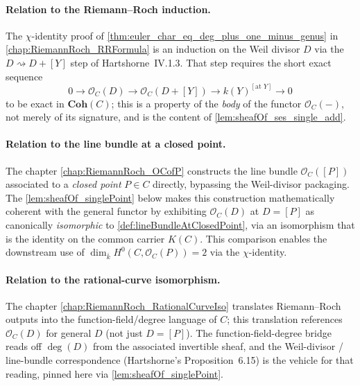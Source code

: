 \paragraph{Relation to the Riemann--Roch induction.}
The \(\chi\)-identity proof of
\cref{thm:euler_char_eq_deg_plus_one_minus_genus} in
\cref{chap:RiemannRoch_RRFormula} is an induction on the Weil divisor
\(D\) via the \(D \rightsquigarrow D + [Y]\) step of Hartshorne~IV.1.3.
That step requires the short exact sequence
\[
  0 \to \mathcal O_C(D) \to \mathcal O_C(D + [Y]) \to k(Y)^{[\text{at } Y]}
  \to 0
\]
to be exact in \(\mathbf{Coh}(C)\); this is a property of the
\emph{body} of the functor \(\mathcal O_C(-)\), not merely of its
signature, and is the content of \cref{lem:sheafOf_ses_single_add}.

\paragraph{Relation to the line bundle at a closed point.}
The chapter \cref{chap:RiemannRoch_OCofP} constructs the line bundle
\(\mathcal O_C([P])\) associated to a \emph{closed point} \(P \in C\)
directly, bypassing the Weil-divisor packaging.
The \cref{lem:sheafOf_singlePoint} below makes this construction
mathematically coherent with the general functor by exhibiting
\(\mathcal O_C(D)\) at \(D = [P]\) as canonically \emph{isomorphic} to
\cref{def:lineBundleAtClosedPoint}, via an isomorphism that is the identity
on the common carrier \(K(C)\). This comparison enables the
downstream use of \(\dim_{\bar k} H^0(C, \mathcal O_C(P)) = 2\)
via the \(\chi\)-identity.

\paragraph{Relation to the rational-curve isomorphism.}
The chapter \cref{chap:RiemannRoch_RationalCurveIso} translates
Riemann--Roch outputs into the function-field/degree language of \(C\);
this translation references \(\mathcal O_C(D)\) for general \(D\) (not
just \(D = [P]\)). The function-field-degree bridge reads off \(\deg(D)\)
from the associated invertible sheaf, and the Weil-divisor / line-bundle
correspondence (Hartshorne's Proposition~6.15) is the vehicle for that
reading, pinned here via \cref{lem:sheafOf_singlePoint}.

